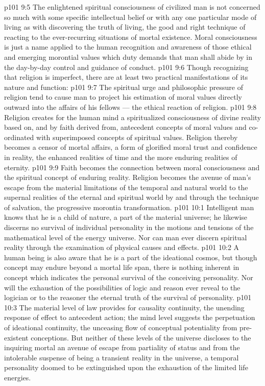 \vs p101 9:5 The enlightened spiritual consciousness of civilized man is not concerned so much with some specific intellectual belief or with any one particular mode of living as with discovering the truth of living, the good and right technique of reacting to the ever\hyp{}recurring situations of mortal existence. Moral consciousness is just a name applied to the human recognition and awareness of those ethical and emerging morontial values which duty demands that man shall abide by in the day\hyp{}by\hyp{}day control and guidance of conduct.
\vs p101 9:6 \pc Though recognizing that religion is imperfect, there are at least two practical manifestations of its nature and function:
\vs p101 9:7 \bibnobreakspace The spiritual urge and philosophic pressure of religion tend to cause man to project his estimation of moral values directly outward into the affairs of his fellows --- the ethical reaction of religion.
\vs p101 9:8 \bibnobreakspace Religion creates for the human mind a spiritualized consciousness of divine reality based on, and by faith derived from, antecedent concepts of moral values and co\hyp{}ordinated with superimposed concepts of spiritual values. Religion thereby becomes a censor of mortal affairs, a form of glorified moral trust and confidence in reality, the enhanced realities of time and the more enduring realities of eternity.
\vs p101 9:9 \pc Faith becomes the connection between moral consciousness and the spiritual concept of enduring reality. Religion becomes the avenue of man’s escape from the material limitations of the temporal and natural world to the supernal realities of the eternal and spiritual world by and through the technique of salvation, the progressive morontia transformation.
\vs p101 10:1 Intelligent man knows that he is a child of nature, a part of the material universe; he likewise discerns no survival of individual personality in the motions and tensions of the mathematical level of the energy universe. Nor can man ever discern spiritual reality through the examination of physical causes and effects.
\vs p101 10:2 A human being is also aware that he is a part of the ideational cosmos, but though concept may endure beyond a mortal life span, there is nothing inherent in concept which indicates the personal survival of the conceiving personality. Nor will the exhaustion of the possibilities of logic and reason ever reveal to the logician or to the reasoner the eternal truth of the survival of personality.
\vs p101 10:3 The material level of law provides for causality continuity, the unending response of effect to antecedent action; the mind level suggests the perpetuation of ideational continuity, the unceasing flow of conceptual potentiality from pre\hyp{}existent conceptions. But neither of these levels of the universe discloses to the inquiring mortal an avenue of escape from partiality of status and from the intolerable suspense of being a transient reality in the universe, a temporal personality doomed to be extinguished upon the exhaustion of the limited life energies.
